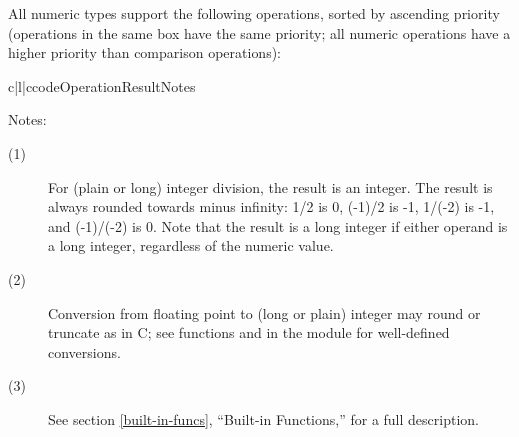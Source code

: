 All numeric types support the following operations, sorted by
ascending priority (operations in the same box have the same
priority; all numeric operations have a higher priority than
comparison operations):

\begin{tableiii}{c|l|c}{code}{Operation}{Result}{Notes}
  \hline
  \hline
  \hline
\end{tableiii}

\noindent
Notes:
\begin{description}

\item[(1)]
For (plain or long) integer division, the result is an integer.
The result is always rounded towards minus infinity: 1/2 is 0, 
(-1)/2 is -1, 1/(-2) is -1, and (-1)/(-2) is 0.  Note that the result
is a long integer if either operand is a long integer, regardless of
the numeric value.

\item[(2)]
Conversion from floating point to (long or plain) integer may round or
truncate as in C; see functions  and
 in the  module
for well-defined conversions.

\item[(3)]
See section \ref{built-in-funcs}, ``Built-in Functions,'' for a full
description.

\end{description}

